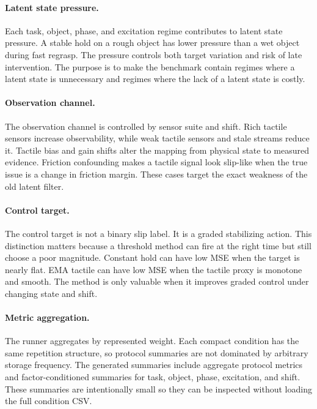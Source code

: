 \documentclass{article}
\begin{document}
\paragraph{Latent state pressure.}
Each task, object, phase, and excitation regime contributes to latent state pressure. A stable hold on a rough object has lower pressure than a wet object during fast regrasp. The pressure controls both target variation and risk of late intervention. The purpose is to make the benchmark contain regimes where a latent state is unnecessary and regimes where the lack of a latent state is costly.

\paragraph{Observation channel.}
The observation channel is controlled by sensor suite and shift. Rich tactile sensors increase observability, while weak tactile sensors and stale streams reduce it. Tactile bias and gain shifts alter the mapping from physical state to measured evidence. Friction confounding makes a tactile signal look slip-like when the true issue is a change in friction margin. These cases target the exact weakness of the old latent filter.

\paragraph{Control target.}
The control target is not a binary slip label. It is a graded stabilizing action. This distinction matters because a threshold method can fire at the right time but still choose a poor magnitude. Constant hold can have low MSE when the target is nearly flat. EMA tactile can have low MSE when the tactile proxy is monotone and smooth. The method is only valuable when it improves graded control under changing state and shift.

\paragraph{Metric aggregation.}
The runner aggregates by represented weight. Each compact condition has the same repetition structure, so protocol summaries are not dominated by arbitrary storage frequency. The generated summaries include aggregate protocol metrics and factor-conditioned summaries for task, object, phase, excitation, and shift. These summaries are intentionally small so they can be inspected without loading the full condition CSV.
\end{document}
